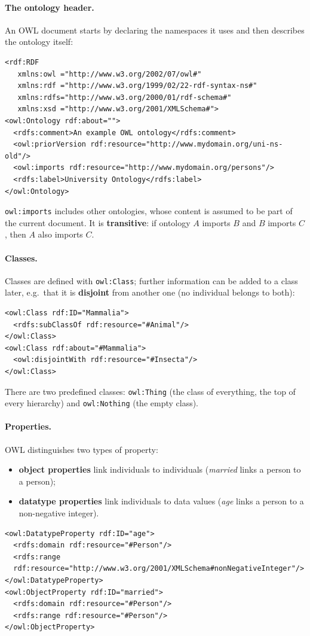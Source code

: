 \paragraph{The ontology header.} An OWL document starts by declaring the namespaces it
uses and then describes the ontology itself:
\begin{verbatim}
<rdf:RDF
   xmlns:owl ="http://www.w3.org/2002/07/owl#"
   xmlns:rdf ="http://www.w3.org/1999/02/22-rdf-syntax-ns#"
   xmlns:rdfs="http://www.w3.org/2000/01/rdf-schema#"
   xmlns:xsd ="http://www.w3.org/2001/XMLSchema#">
<owl:Ontology rdf:about="">
  <rdfs:comment>An example OWL ontology</rdfs:comment>
  <owl:priorVersion rdf:resource="http://www.mydomain.org/uni-ns-old"/>
  <owl:imports rdf:resource="http://www.mydomain.org/persons"/>
  <rdfs:label>University Ontology</rdfs:label>
</owl:Ontology>
\end{verbatim}
\texttt{owl:imports} includes other ontologies, whose content is assumed to be part of
the current document. It is \textbf{transitive}: if ontology $A$ imports $B$ and $B$
imports $C$, then $A$ also imports $C$.

\paragraph{Classes.} Classes are defined with \texttt{owl:Class}; further information
can be added to a class later, e.g.\ that it is \textbf{disjoint} from another one (no
individual belongs to both):
\begin{verbatim}
<owl:Class rdf:ID="Mammalia">
  <rdfs:subClassOf rdf:resource="#Animal"/>
</owl:Class>
<owl:Class rdf:about="#Mammalia">
  <owl:disjointWith rdf:resource="#Insecta"/>
</owl:Class>
\end{verbatim}
There are two predefined classes: \texttt{owl:Thing} (the class of everything, the top
of every hierarchy) and \texttt{owl:Nothing} (the empty class).

\paragraph{Properties.} OWL distinguishes two types of property:
\begin{itemize}[nosep]
  \item \textbf{object properties} link individuals to individuals (\emph{married}
        links a person to a person);
  \item \textbf{datatype properties} link individuals to data values (\emph{age} links a
        person to a non-negative integer).
\end{itemize}
\begin{verbatim}
<owl:DatatypeProperty rdf:ID="age">
  <rdfs:domain rdf:resource="#Person"/>
  <rdfs:range
  rdf:resource="http://www.w3.org/2001/XMLSchema#nonNegativeInteger"/>
</owl:DatatypeProperty>
<owl:ObjectProperty rdf:ID="married">
  <rdfs:domain rdf:resource="#Person"/>
  <rdfs:range rdf:resource="#Person"/>
</owl:ObjectProperty>
\end{verbatim}

